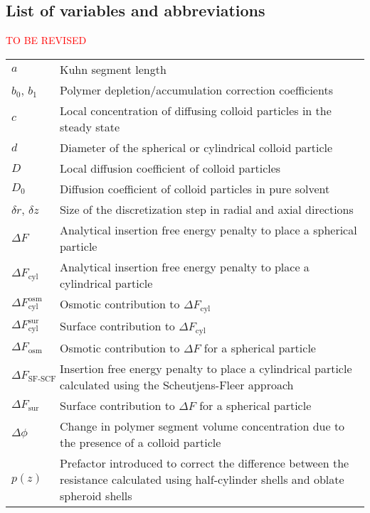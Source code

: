\documentclass[10pt, a4paper, twocolumn]{article}
\newcommand\todo[1]{\textcolor{red}{#1}}
\begin{document}
\onecolumn
\subsection*{List of variables and abbreviations}
\todo{TO BE REVISED}

%
\begin{tabularx}{\linewidth}{l X}
    $a$ & Kuhn segment length \\
    $b_0$, $b_1$ & Polymer depletion/accumulation correction coefficients \\
    $c$ & Local concentration of diffusing colloid particles in the steady state \\
    $d$ & Diameter of the spherical or cylindrical colloid particle \\
    $D$ & Local diffusion coefficient of colloid particles \\
    $D_0$ & Diffusion coefficient of colloid particles in pure solvent \\
    $\delta r$, $\delta z$ & Size of the discretization step in radial and axial directions \\
    $\Delta F$ & Analytical insertion free energy penalty to place a spherical particle \\
    $\Delta F_{\text{cyl}}$ & Analytical insertion free energy penalty to place a cylindrical particle \\
    $\Delta F_{\text{cyl}}^{\text{osm}}$ & Osmotic contribution to $\Delta F_{\text{cyl}}$ \\
    $\Delta F_{\text{cyl}}^{\text{sur}}$ & Surface contribution to $\Delta F_{\text{cyl}}$ \\
    $\Delta F_{\text{osm}}$ & Osmotic contribution to $\Delta F$ for a spherical particle\\
    $\Delta F_{\text{SF-SCF}}$ & Insertion free energy penalty to place a cylindrical particle calculated using the Scheutjens-Fleer approach \\
    $\Delta F_{\text{sur}}$ & Surface contribution to $\Delta F$ for a spherical particle\\
    $\Delta \phi$ & Change in polymer segment volume concentration due to the presence of a colloid particle \\
    $p(z)$ & Prefactor introduced to correct the difference between the resistance calculated using half-cylinder shells and oblate spheroid shells \\

\end{tabularx}
\end{document}
